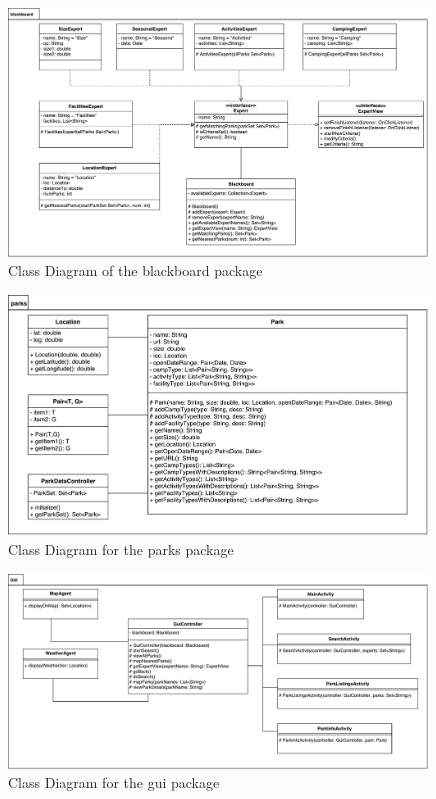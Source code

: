 \documentclass[titlepage,12pt]{article}
\begin{document}
\begin{figure}[H]
    \centerline{\includegraphics[width=0.99\textwidth]{class_diagrams/blackboard_ClassDiagram}}
    \caption{Class Diagram of the blackboard package}
    \label{fig:blackboard_classDiagram}
\end{figure}

\begin{figure}[H]
    \centerline{\includegraphics[width=0.99\textwidth]{class_diagrams/parks_ClassDiagram}}
    \caption{Class Diagram for the parks package}
    \label{fig:parks_classDiagram}
\end{figure}

\begin{figure}[H]
    \centerline{\includegraphics[width=0.99\textwidth]{class_diagrams/gui_ClassDiagram}}
    \caption{Class Diagram for the gui package}
    \label{fig:gui_classDiagram}
\end{figure}
\end{document}
